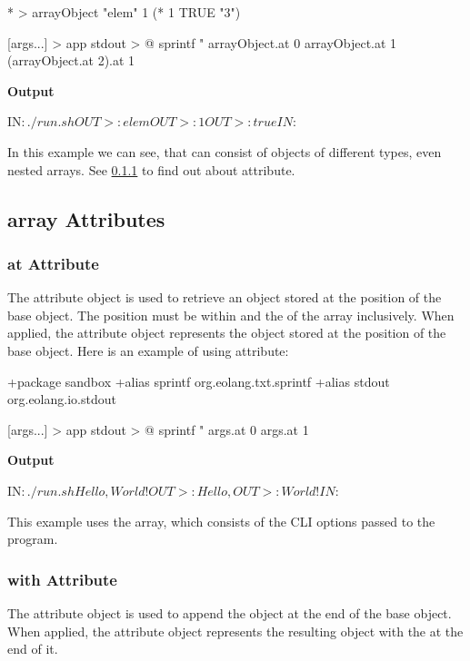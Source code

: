 \documentclass[12pt]{book}
\begin{document}
{{{\begin{ffcode}
* > arrayObject
  "elem"
  1
  (* 1 TRUE "3")

[args...] > app
  stdout > @
    sprintf
      "%
      arrayObject.at 0
      arrayObject.at 1
      (arrayObject.at 2).at 1
\end{ffcode}
\textbf{Output}
\begin{ffcode}
IN$: ./run.sh
OUT>: elem
OUT>: 1
OUT>: true
IN$: 
\end{ffcode}
In this example we can see, that  can consist of objects of different types, even nested arrays. See \ref{subsubsec:at-attr} to find out about  attribute.

\subsection{array Attributes}

\subsubsection{at Attribute} \label{subsubsec:at-attr}
The  attribute object is used to retrieve an object stored at the position  of the base  object.
The position  must be within  and the  of the array inclusively.
When applied, the  attribute object represents the object stored at the position  of the base  object. Here is an example of using  attribute:

\begin{ffcode}
+package sandbox
+alias sprintf org.eolang.txt.sprintf
+alias stdout org.eolang.io.stdout

[args...] > app
  stdout > @
    sprintf
      "%
      args.at 0
      args.at 1
\end{ffcode}
\textbf{Output}
\begin{ffcode}
IN$: ./run.sh Hello, World!
OUT>: Hello,
OUT>: World!
IN$: 
\end{ffcode}

This example uses the  array, which consists of the CLI options passed to the program.

\subsubsection{with Attribute}
The  attribute object is used to append the  object at the end of the base  object.
When applied, the  attribute object represents the resulting  object with the  at the end of it.

}}}
\end{document}
